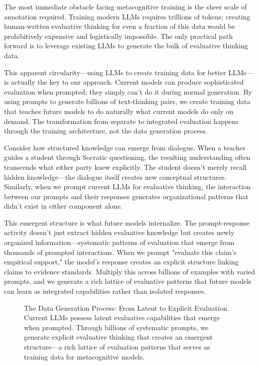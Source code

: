 \documentclass[11pt]{article}
\begin{document}
	The most immediate obstacle facing metacognitive training is the sheer scale of annotation required. Training modern LLMs requires trillions of tokens; creating human-written evaluative thinking for even a fraction of this data would be prohibitively expensive and logistically impossible. The only practical path forward is to leverage existing LLMs to generate the bulk of evaluative thinking data.
	
	This apparent circularity—using LLMs to create training data for better LLMs—is actually the key to our approach. Current models can produce sophisticated evaluation when prompted; they simply can't do it during normal generation. By using prompts to generate billions of text-thinking pairs, we create training data that teaches future models to do naturally what current models do only on demand. The transformation from separate to integrated evaluation happens through the training architecture, not the data generation process.
	
	Consider how structured knowledge can emerge from dialogue. When a teacher guides a student through Socratic questioning, the resulting understanding often transcends what either party knew explicitly. The student doesn't merely recall hidden knowledge—the dialogue itself creates new conceptual structures. Similarly, when we prompt current LLMs for evaluative thinking, the interaction between our prompts and their responses generates organizational patterns that didn't exist in either component alone.
	
	This emergent structure is what future models internalize. The prompt-response activity doesn't just extract hidden evaluative knowledge but creates newly organized information—systematic patterns of evaluation that emerge from thousands of prompted interactions. When we prompt "evaluate this claim's empirical support," the model's response creates an explicit structure linking claims to evidence standards. Multiply this across billions of examples with varied prompts, and we generate a rich lattice of evaluative patterns that future models can learn as integrated capabilities rather than isolated responses.
	
	\begin{figure}[h]
		\centering
		
		\caption{The Data Generation Process: From Latent to Explicit Evaluation. Current LLMs possess latent evaluative capabilities that emerge when prompted. Through billions of systematic prompts, we generate explicit evaluative thinking that creates an emergent structure—a rich lattice of evaluation patterns that serves as training data for metacognitive models.}
		\label{fig:data-generation}
	\end{figure}
	
\end{document}
